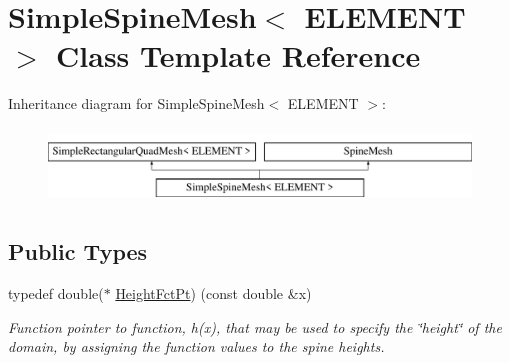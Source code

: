 \hypertarget{classSimpleSpineMesh}{}\section{Simple\+Spine\+Mesh$<$ E\+L\+E\+M\+E\+NT $>$ Class Template Reference}
\label{classSimpleSpineMesh}
Inheritance diagram for Simple\+Spine\+Mesh$<$ E\+L\+E\+M\+E\+NT $>$\+:\begin{figure}[H]
\begin{center}
\leavevmode
\includegraphics[height=2.000000cm]{classSimpleSpineMesh}
\end{center}
\end{figure}
\subsection*{Public Types}
\begin{DoxyCompactItemize}
\item 
typedef double($\ast$ \hyperlink{classSimpleSpineMesh_a671d96f0143dfeb7aaba8af56c0c0620}{Height\+Fct\+Pt}) (const double \&x)
\begin{DoxyCompactList}\small\item\em Function pointer to function, h(x), that may be used to specify the \char`\"{}height\char`\"{} of the domain, by assigning the function values to the spine heights. \end{DoxyCompactList}\end{DoxyCompactItemize}
